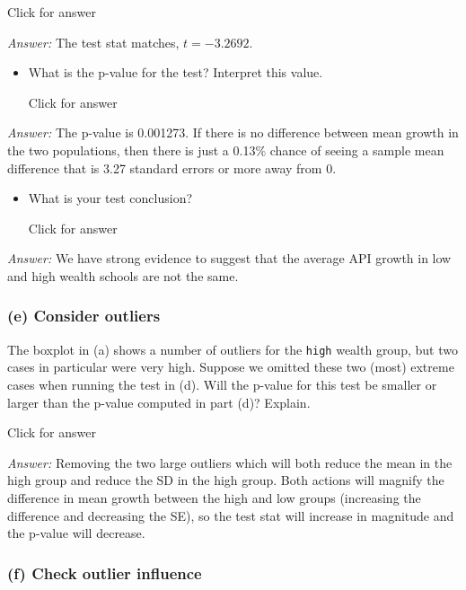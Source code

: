 \documentclass[
]{book}
\providecommand{\tightlist}{%
  \setlength{\itemsep}{0pt}\setlength{\parskip}{0pt}}
\begin{document}
Click for answer

\emph{Answer:} The test stat matches, \(t = -3.2692\).

\begin{itemize}
\tightlist
\item
  What is the p-value for the test? Interpret this value.

  Click for answer
\end{itemize}

\emph{Answer:} The p-value is 0.001273. If there is no difference between mean growth in the two populations, then there is just a 0.13\% chance of seeing a sample mean difference that is 3.27 standard errors or more away from 0.

\begin{itemize}
\tightlist
\item
  What is your test conclusion?

  Click for answer
\end{itemize}

\emph{Answer:} We have strong evidence to suggest that the average API growth in low and high wealth schools are not the same.

\hypertarget{e-consider-outliers}{%
\subsubsection{(e) Consider outliers}\label{e-consider-outliers}}

The boxplot in (a) shows a number of outliers for the \texttt{high} wealth group, but two cases in particular were very high. Suppose we omitted these two (most) extreme cases when running the test in (d). Will the p-value for this test be smaller or larger than the p-value computed in part (d)? Explain.

Click for answer

\emph{Answer:} Removing the two large outliers which will both reduce the mean in the high group and reduce the SD in the high group. Both actions will magnify the difference in mean growth between the high and low groups (increasing the difference and decreasing the SE), so the test stat will increase in magnitude and the p-value will decrease.

\hypertarget{f-check-outlier-influence}{%
\subsubsection{(f) Check outlier influence}\label{f-check-outlier-influence}}
\end{document}
